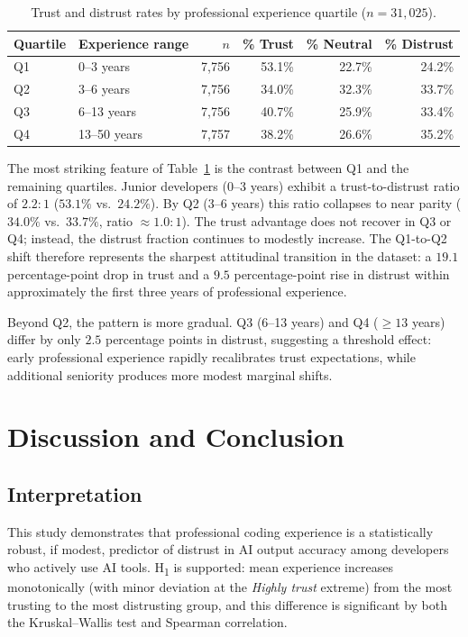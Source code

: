 \documentclass[11pt,a4paper]{article}
\begin{document}
\begin{table}[ht]
\centering
\caption{Trust and distrust rates by professional experience quartile ($n = 31{,}025$).}
\label{tab:quartiles}
\renewcommand{\arraystretch}{1.15}
\begin{tabular}{llrrrr}
\toprule
Quartile & Experience range & $n$ & \% Trust & \% Neutral & \% Distrust \\
\midrule
Q1 & 0--3 years   & 7{,}756 & 53.1\% & 22.7\% & 24.2\% \\
Q2 & 3--6 years   & 7{,}756 & 34.0\% & 32.3\% & 33.7\% \\
Q3 & 6--13 years  & 7{,}756 & 40.7\% & 25.9\% & 33.4\% \\
Q4 & 13--50 years & 7{,}757 & 38.2\% & 26.6\% & 35.2\% \\
\bottomrule
\end{tabular}
\end{table}

The most striking feature of Table~\ref{tab:quartiles} is the contrast between Q1
and the remaining quartiles. Junior developers (0--3 years) exhibit a trust-to-distrust
ratio of $2.2:1$ ($53.1\%$ vs.\ $24.2\%$). By Q2 (3--6 years) this ratio collapses
to near parity ($34.0\%$ vs.\ $33.7\%$, ratio $\approx 1.0:1$). The trust advantage
does not recover in Q3 or Q4; instead, the distrust fraction continues to modestly
increase. The Q1-to-Q2 shift therefore represents the sharpest attitudinal transition
in the dataset: a $19.1$ percentage-point drop in trust and a $9.5$ percentage-point
rise in distrust within approximately the first three years of professional experience.

Beyond Q2, the pattern is more gradual. Q3 (6--13 years) and Q4 ($\geq 13$ years)
differ by only $2.5$ percentage points in distrust, suggesting a threshold effect:
early professional experience rapidly recalibrates trust expectations, while additional
seniority produces more modest marginal shifts.

\section{Discussion and Conclusion}
\label{sec:discussion}

\subsection{Interpretation}

This study demonstrates that professional coding experience is a statistically robust,
if modest, predictor of distrust in AI output accuracy among developers who actively
use AI tools. H\textsubscript{1} is supported: mean experience increases monotonically
(with minor deviation at the \emph{Highly trust} extreme) from the most trusting to
the most distrusting group, and this difference is significant by both the Kruskal--Wallis
test and Spearman correlation.
\end{document}

